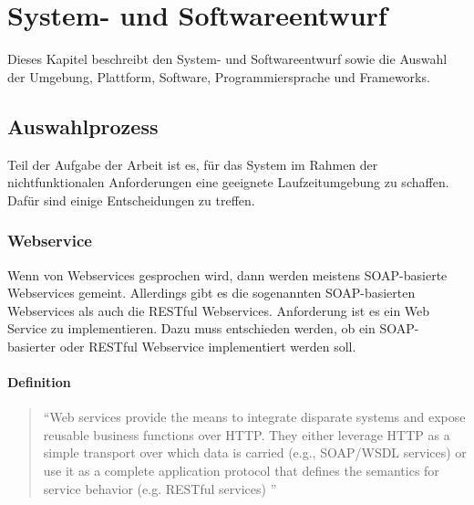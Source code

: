 \chapter{System- und Softwareentwurf} \label{kap:systemundsoftwarentwurf}


Dieses Kapitel beschreibt den System- und Softwareentwurf sowie die Auswahl der Umgebung, Plattform, Software, Programmiersprache und Frameworks.

\section{Auswahlprozess}

Teil der Aufgabe der Arbeit ist es, für das System im Rahmen der nichtfunktionalen Anforderungen eine geeignete Laufzeitumgebung zu schaffen. Dafür sind einige Entscheidungen zu treffen. 

\subsection{Webservice}\label{sec:webservice}
Wenn von Webservices gesprochen wird, dann werden meistens \gls{SOAP}-basierte Webservices gemeint. Allerdings gibt es die sogenannten \gls{SOAP}-basierten Webservices als auch die \gls{REST}ful Webservices. Anforderung ist es ein Web Service zu implementieren. Dazu muss entschieden werden, ob ein \gls{SOAP}-basierter oder \gls{REST}ful Webservice implementiert werden soll.  

\subsubsection{Definition}

\begin{quotation}
\enquote{Web services provide the means to integrate disparate systems and expose reusable business functions over HTTP. They either leverage HTTP as a simple transport over which data is carried (e.g., SOAP/\gls{WSDL} services) or use it as a complete application protocol that defines the semantics for service behavior (e.g. RESTful services) \citep[S. 2][]{robinsonService}}	
\end{quotation}

